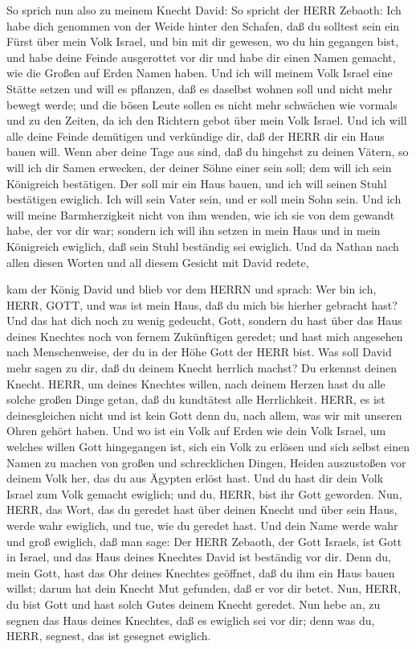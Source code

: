  So sprich nun also zu meinem Knecht David: So spricht der
HERR Zebaoth: Ich habe dich genommen von der Weide hinter den Schafen,
daß du solltest sein ein Fürst über mein Volk Israel,  und
bin mit dir gewesen, wo du hin gegangen bist, und habe deine Feinde
ausgerottet vor dir und habe dir einen Namen gemacht, wie die Großen auf
Erden Namen haben.  Und ich will meinem Volk Israel eine
Stätte setzen und will es pflanzen, daß es daselbst wohnen soll und
nicht mehr bewegt werde; und die bösen Leute sollen es nicht mehr
schwächen wie vormals und zu den Zeiten, da ich den Richtern gebot über
mein Volk Israel.  Und ich will alle deine Feinde demütigen
und verkündige dir, daß der HERR dir ein Haus bauen will. 
Wenn aber deine Tage aus sind, daß du hingehst zu deinen Vätern, so will
ich dir Samen erwecken, der deiner Söhne einer sein soll; dem will ich
sein Königreich bestätigen.  Der soll mir ein Haus bauen,
und ich will seinen Stuhl bestätigen ewiglich.  Ich will
sein Vater sein, und er soll mein Sohn sein. Und ich will meine
Barmherzigkeit nicht von ihm wenden, wie ich sie von dem gewandt habe,
der vor dir war;  sondern ich will ihn setzen in mein Haus
und in mein Königreich ewiglich, daß sein Stuhl beständig sei ewiglich.
 Und da Nathan nach allen diesen Worten und all diesem
Gesicht mit David redete,

 kam der König David und blieb vor dem HERRN und sprach:
Wer bin ich, HERR, GOTT, und was ist mein Haus, daß du mich bis hierher
gebracht hast?  Und das hat dich noch zu wenig gedeucht,
Gott, sondern du hast über das Haus deines Knechtes noch von fernem
Zukünftigen geredet; und hast mich angesehen nach Menschenweise, der du
in der Höhe Gott der HERR bist.  Was soll David mehr sagen
zu dir, daß du deinem Knecht herrlich machst? Du erkennst deinen Knecht.
 HERR, um deines Knechtes willen, nach deinem Herzen hast
du alle solche großen Dinge getan, daß du kundtätest alle Herrlichkeit.
 HERR, es ist deinesgleichen nicht und ist kein Gott denn
du, nach allem, was wir mit unseren Ohren gehört haben. 
Und wo ist ein Volk auf Erden wie dein Volk Israel, um welches willen
Gott hingegangen ist, sich ein Volk zu erlösen und sich selbst einen
Namen zu machen von großen und schrecklichen Dingen, Heiden auszustoßen
vor deinem Volk her, das du aus Ägypten erlöst hast.  Und
du hast dir dein Volk Israel zum Volk gemacht ewiglich; und du, HERR,
bist ihr Gott geworden.  Nun, HERR, das Wort, das du
geredet hast über deinen Knecht und über sein Haus, werde wahr ewiglich,
und tue, wie du geredet hast.  Und dein Name werde wahr und
groß ewiglich, daß man sage: Der HERR Zebaoth, der Gott Israels, ist
Gott in Israel, und das Haus deines Knechtes David ist beständig vor
dir.  Denn du, mein Gott, hast das Ohr deines Knechtes
geöffnet, daß du ihm ein Haus bauen willst; darum hat dein Knecht Mut
gefunden, daß er vor dir betet.  Nun, HERR, du bist Gott
und hast solch Gutes deinem Knecht geredet.  Nun hebe an,
zu segnen das Haus deines Knechtes, daß es ewiglich sei vor dir; denn
was du, HERR, segnest, das ist gesegnet ewiglich.

